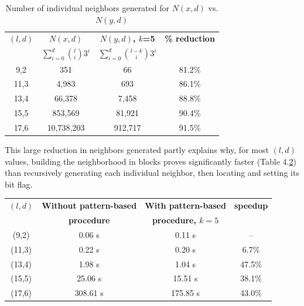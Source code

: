 \documentclass[oneside,12pt]{DISCSthesis}
\begin{document}
{		\begin{table}[h] %
			\small
			\renewcommand{\arraystretch}{1.3}
			\label{tbl:neighbors_blockmasking}
			\centering
			\begin{tabular}{|c|c|c|c|}
			\hline 
			\bfseries\boldmath $(l,d)$ & \bfseries\boldmath $N(x,d)$ & \bfseries\boldmath $N(y,d)$, $k$=5 & \bfseries \% reduction\\
			\bfseries & \bfseries\boldmath $\sum_{i=0}^{d} \binom{l}{i} 3^{i}$ & \bfseries\boldmath $\sum_{i=0}^{d} \binom{l-k}{i} 3^{i}$ & \\
			\hline
			 9,2 &         351  &       66 & 81.2\%\\
			11,3 &       4,983  &      693 & 86.1\%\\
			13,4 &      66,378  &    7,458 & 88.8\%\\
			15,5 &     853,569  &   81,921 & 90.4\%\\
			17,6 &  10,738,203  &  912,717 & 91.5\%\\
			\hline\end{tabular}

			\caption{\small Number of individual neighbors generated for $N(x,d)$ vs. $N(y,d)$}
			\end{table}

		\noindent This large reduction in neighbors generated partly explains why, for most $(l,d)$ values, building the neighborhood in blocks proves significantly faster (Table 4.\ref{tbl:speedup_blockmasking}) than recursively generating each individual neighbor, then locating and setting its bit flag. \newline 

		\begin{table}[h] %
			\small
			\renewcommand{\arraystretch}{1.3}
			\label{tbl:speedup_blockmasking}
			\centering
			\begin{tabular}{|c|c|c|c|}
			\hline 
			\bfseries\boldmath $(l,d)$ & \bfseries Without pattern-based & \bfseries With pattern-based & \bfseries speedup\\
			\bfseries & \bfseries procedure & \bfseries\boldmath procedure, $k=5$ & \bfseries\\
			\hline
			 (9,2) &   0.06 s &    0.11 s &     --  \\
			(11,3) &   0.22 s &    0.20 s &    6.7\%\\
			(13,4) &   1.98 s &    1.04 s &   47.5\%\\
			(15,5) &  25.06 s &   15.51 s &   38.1\%\\
			(17,6) & 308.61 s &  175.85 s &   43.0\%\\
			\hline\end{tabular}


\end{table}}
\end{document}
